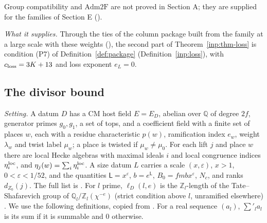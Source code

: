 \documentclass[10pt]{amsart}
\theoremstyle{definition}
\theoremstyle{remark}
\newcommand{\Z}{\mathbb Z}
\newcommand{\Q}{\mathbb Q}
\begin{document}
Group compatibility and $\mathrm{Adm2F}$ are not proved in Section A; they
are supplied for the families of Section E
(\cite[Proposition~\ref{A-i4:hyp-loss}(a)]{Annex}).

\emph{What it supplies.} Through the ties of the column package built from
the family at a large scale with these weights
(\cite[Lemma~\ref{A-i4:Llem-L8}]{Annex}), the second part of
Theorem~\ref{inp:thm-loss} is condition (P7) of
Definition~\ref{def:package} (Definition~\ref{inp:loss}), with
$c_{\rm loss}=3K+13$ and loss exponent $e_L=0$.

\subsection{The divisor bound}\label{inp:ssec-div}

\emph{Setting.} A datum $D$ has a CM host field $E=E_D$, abelian over $\Q$
of degree $2f$, generator primes $g_0,g_1$, a set of tops, and a coefficient
field with a finite set of places $w$, each with a residue characteristic
$p(w)$, ramification index $e_w$, weight $\lambda_w$ and twist label
$\mu_w$; a place is twisted if $\mu_w\ne\mu_0$. For each lift $j$ and place
$w$ there are local Hecke algebras with maximal ideals $i$ and local
congruence indices $\eta^{\rm loc}_i$, and $\eta_j(w)=\sum_i\eta^{\rm
loc}_i$. A size datum $L$ carries a scale $(x,\varepsilon)$, $x>1$,
$0<\varepsilon<1/52$, and the quantities $\mathsf L=x^\varepsilon$,
$b=e^{\mathsf L}$, $B_0=fmbx^\varepsilon$, $N_c$, and ranks
$d_{Z_0}(j)$. The full list is \cite[Definition~\ref{A-i2:def-data}]{Annex}.
For $l$ prime, $\ell_D(l,e)$ is the $\Z_l$-length of the
Tate--Shafarevich group of $\Q_l/\Z_l(\chi^{-e})$ (strict condition above
$l$, unramified elsewhere) \cite[Definition~\ref{A-i2:def-LData}]{Annex}. We
use the following definitions, copied from
\cite[Definitions~\ref{A-i2:def-vv}--\ref{A-i2:def-HypV}]{Annex}. For a real
sequence $(a_l)$, $\sum'_la_l$ is its sum if it is summable and $0$
otherwise.
\end{document}
